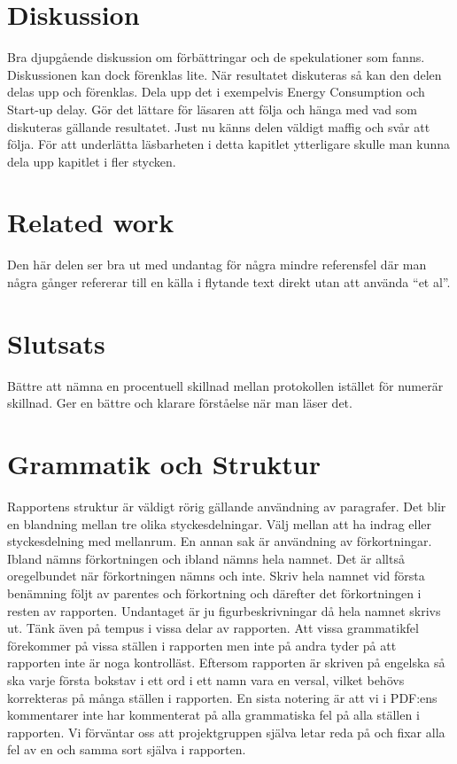 \documentclass{article}
\begin{document}
\section{Diskussion}
Bra djupgående diskussion om förbättringar och de spekulationer som fanns. Diskussionen kan dock förenklas lite. När resultatet diskuteras så kan den delen delas upp och förenklas. Dela upp det i exempelvis Energy Consumption och Start-up delay. Gör det lättare för läsaren att följa och hänga med vad som diskuteras gällande resultatet. Just nu känns delen väldigt maffig och svår att följa. För att underlätta läsbarheten i detta kapitlet ytterligare skulle man kunna dela upp kapitlet i fler stycken.


\section{Related work}
Den här delen ser bra ut med undantag för några mindre referensfel där man några gånger refererar till en källa i flytande text direkt utan att använda “et al”.


\section{Slutsats}
Bättre att nämna en procentuell skillnad mellan protokollen istället för numerär skillnad. Ger en bättre och klarare förståelse när man läser det.

\section{Grammatik och Struktur}
Rapportens struktur är väldigt rörig gällande användning av paragrafer. Det blir en blandning mellan tre olika styckesdelningar. Välj mellan att ha indrag eller styckesdelning med mellanrum. En annan sak är användning av förkortningar. Ibland nämns förkortningen och ibland nämns hela namnet. Det är alltså oregelbundet när förkortningen nämns och inte. Skriv hela namnet vid första benämning följt av parentes och förkortning och därefter det förkortningen i resten av rapporten. Undantaget är ju figurbeskrivningar då hela namnet skrivs ut. Tänk även på tempus i vissa delar av rapporten. Att vissa grammatikfel förekommer på vissa ställen i rapporten men inte på andra tyder på att rapporten inte är noga kontrolläst. Eftersom rapporten är skriven på engelska så ska varje första bokstav i ett ord i ett namn vara en versal, vilket behövs korrekteras på många ställen i rapporten. En sista notering är att vi i PDF:ens kommentarer inte har kommenterat på alla grammatiska fel på alla ställen i rapporten. Vi förväntar oss att projektgruppen själva letar reda på och fixar alla fel av en och samma sort själva i rapporten.
\end{document}
